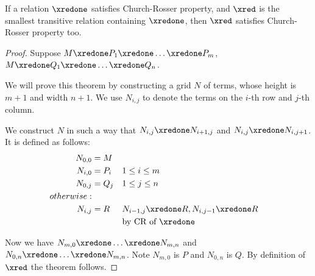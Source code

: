 \documentclass[../../../include/open-logic-section]{subfiles}
\begin{document}
\begin{thm} 
  If a relation $\xredone$ satisfies Church-Rosser property, and $\xred$ is the
  smallest transitive relation containing $\xredone$, then $\xred$ satisfies
  Church-Rosser property too.
\end{thm}
\begin{proof}
  Suppose $M \xredone P_1 \xredone \ldots \xredone P_m$, $M \xredone Q_1
  \xredone \ldots \xredone Q_n$.
  
  We will prove this theorem by constructing a grid $N$ of terms, whose height is $m + 1$ and width $n + 1$. We use $N_{i,j}$ to denote the terms
  on the $i$-th row and $j$-th column.
  
  We construct $N$ in such a way that $N_{i,j} \xredone N_{i+1,j}$ and
  $N_{i,j} \xredone N_{i,j+1}$. It is defined as follows:
  \begin{align*}
    N_{0,0} &= M \\
    N_{i,0} &= P_i && 1 \le i \le m \\
    N_{0,j} &= Q_j && 1 \le j \le n \\
    otherwise: & \\
    N_{i,j} &= R && N_{i-1,j} \xredone R, N_{i,j-1} \xredone R \\
            & && \text{by CR of $\xredone$}
  \end{align*}

  Now we have $N_{m,0} \xredone \ldots \xredone N_{m,n}$ and $N_{0,n}
  \xredone \ldots \xredone N_{m,n}$. Note $N_{m,0}$ is $P$ and $N_{0,n}$
  is $Q$. By definition of $\xred$ the theorem follows.
\end{proof}
\end{document}
